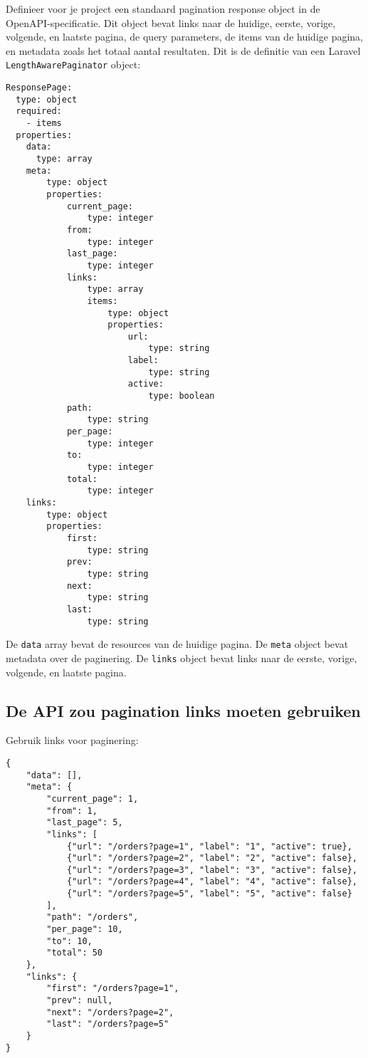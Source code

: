 Definieer voor je project een standaard pagination response object in de OpenAPI-specificatie. Dit object bevat links naar de huidige, eerste, vorige, volgende, en laatste pagina, de query parameters, de items van de huidige pagina, en metadata zoals het totaal aantal resultaten. Dit is de definitie van een Laravel \texttt{LengthAwarePaginator} object:

\begin{verbatim}
ResponsePage:
  type: object
  required:
    - items
  properties:
    data:
      type: array
    meta:
        type: object
        properties:
            current_page:
                type: integer
            from:
                type: integer
            last_page:
                type: integer
            links:
                type: array
                items:
                    type: object
                    properties:
                        url:
                            type: string
                        label:
                            type: string
                        active:
                            type: boolean
            path:
                type: string
            per_page:
                type: integer
            to:
                type: integer
            total:
                type: integer
    links:
        type: object
        properties:
            first:
                type: string
            prev:
                type: string
            next:
                type: string
            last:
                type: string
\end{verbatim}

De \texttt{data} array bevat de resources van de huidige pagina. De \texttt{meta} object bevat metadata over de paginering. De \texttt{links} object bevat links naar de eerste, vorige, volgende, en laatste pagina.

\subsection{De API zou pagination links moeten gebruiken}
\label{subsection:paginering_links}

Gebruik links voor paginering:

\begin{verbatim}
{
    "data": [],
    "meta": {
        "current_page": 1,
        "from": 1,
        "last_page": 5,
        "links": [
            {"url": "/orders?page=1", "label": "1", "active": true},
            {"url": "/orders?page=2", "label": "2", "active": false},
            {"url": "/orders?page=3", "label": "3", "active": false},
            {"url": "/orders?page=4", "label": "4", "active": false},
            {"url": "/orders?page=5", "label": "5", "active": false}
        ],
        "path": "/orders",
        "per_page": 10,
        "to": 10,
        "total": 50
    },
    "links": {
        "first": "/orders?page=1",
        "prev": null,
        "next": "/orders?page=2",
        "last": "/orders?page=5"
    }
}
\end{verbatim}

